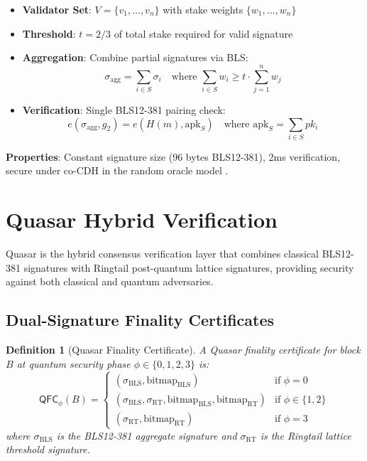 \documentclass[11pt]{article}
\newtheorem{definition}{Definition}
\begin{document}
\begin{itemize}[leftmargin=1.1em]
  \item \textbf{Validator Set}: $V = \{v_1, \ldots, v_n\}$ with stake weights $\{w_1, \ldots, w_n\}$
  \item \textbf{Threshold}: $t = 2/3$ of total stake required for valid signature
  \item \textbf{Aggregation}: Combine partial signatures via BLS:
  \begin{equation}
    \sigma_{\text{agg}} = \sum_{i \in S} \sigma_i \quad \text{where } \sum_{i \in S} w_i \geq t \cdot \sum_{j=1}^n w_j
  \end{equation}
  \item \textbf{Verification}: Single BLS12-381 pairing check:
  \begin{equation}
    e(\sigma_{\text{agg}}, g_2) = e(H(m), \text{apk}_S) \quad \text{where } \text{apk}_S = \sum_{i \in S} pk_i
  \end{equation}
\end{itemize}

\textbf{Properties}: Constant signature size (96 bytes BLS12-381), 2ms verification, secure under co-CDH in the random oracle model \cite{boneh2001bls}.

\section{Quasar Hybrid Verification}\label{sec:quasar}

Quasar is the hybrid consensus verification layer that combines classical BLS12-381 signatures with Ringtail post-quantum lattice signatures, providing security against both classical and quantum adversaries.

\subsection{Dual-Signature Finality Certificates}

\begin{definition}[Quasar Finality Certificate]
A Quasar finality certificate for block $B$ at quantum security phase $\phi \in \{0, 1, 2, 3\}$ is:
\begin{equation}
\mathsf{QFC}_\phi(B) = \begin{cases}
(\sigma_{\text{BLS}}, \text{bitmap}_{\text{BLS}}) & \text{if } \phi = 0 \\
(\sigma_{\text{BLS}}, \sigma_{\text{RT}}, \text{bitmap}_{\text{BLS}}, \text{bitmap}_{\text{RT}}) & \text{if } \phi \in \{1, 2\} \\
(\sigma_{\text{RT}}, \text{bitmap}_{\text{RT}}) & \text{if } \phi = 3
\end{cases}
\end{equation}
where $\sigma_{\text{BLS}}$ is the BLS12-381 aggregate signature and $\sigma_{\text{RT}}$ is the Ringtail lattice threshold signature.
\end{definition}
\end{document}
